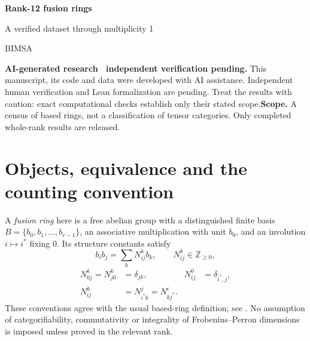 \documentclass[11pt,a4paper]{article}
\theoremstyle{definition}\newtheorem{definition}[theorem]{Definition}\newtheorem{remark}[theorem]{Remark}
\newcommand{\NN}{\mathbb Z_{\geq0}}\newcommand{\FPdim}{\operatorname{FPdim}}
\begin{document}
\par\vspace{1cm}
{\sffamily\Huge\bfseries\color{ink} Rank-12 fusion rings\par}
\vspace{0.35cm}
{\sffamily\Large A verified dataset through multiplicity 1\par}
\vspace{0.65cm}{\large Sébastien Palcoux}\par{\small BIMSA}\par\vspace{0.35cm}{\small Computational companion, 26 October 2026}\par\vspace{0.8cm}
\begin{abstract}
We document 632 verified based-isomorphism classes of fusion rings of rank 12 through multiplicity 1, including 632 at the maximum multiplicity. The producer reports a complete enumeration. The complete optimized source is supplied and hash-matched, but full enumeration has not been independently reproduced. The account separates the mathematical coverage argument, the completed search, and independent verification of the emitted tensors. All duality types are included, and no categorifiability filter is applied. Code, machine-readable counts, full multiplication tensors and provenance records accompany the text.
\end{abstract}\vspace{0.4cm}\noindent\textbf{AI-generated research \textperiodcentered\ independent verification pending.} This manuscript, its code and data were developed with AI assistance. Independent human verification and Lean formalization are pending. Treat the results with caution: exact computational checks establish only their stated scope.\vfill\noindent\textbf{Scope.} A census of based rings, not a classification of tensor categories. Only completed whole-rank results are released.\newpage\tableofcontents\newpage

\section{Objects, equivalence and the counting convention}
A \emph{fusion ring} here is a free abelian group with a distinguished finite basis
$B=\{b_0,b_1,\ldots,b_{r-1}\}$, an associative multiplication with unit $b_0$,
and an involution $i\mapsto i^*$ fixing $0$. Its structure constants satisfy
\[
b_i b_j=\sum_k N_{ij}^{k}b_k,\qquad N_{ij}^{k}\in\NN,
\]
\begin{align}
N_{0j}^{k}=N_{j0}^{k}&=\delta_{jk},&N_{ij}^{0}&=\delta_{i^*,j},\\
N_{ij}^{k}&=N_{i^*k}^{j}=N_{kj^*}^{i}.&&\label{eq:reciprocity}
\end{align}
These conventions agree with the usual based-ring definition; see
\cite{EGNO,VS}. No assumption of categorifiability, commutativity or integrality
of Frobenius--Perron dimensions is imposed unless proved in the relevant rank.
\end{document}
